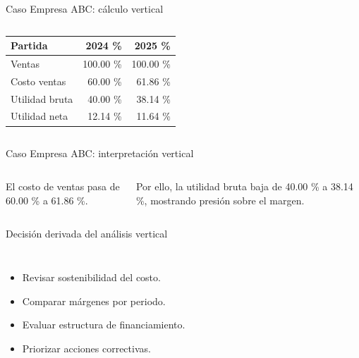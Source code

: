 \begin{frame}{Caso Empresa ABC: cálculo vertical}
  \begin{columns}[T,onlytextwidth]
    \scriptsize
    \begin{tabular}{lrr}
      \toprule
      Partida & 2024 \% & 2025 \% \\
      \midrule
      Ventas & 100.00 \% & 100.00 \% \\
      Costo ventas & 60.00 \% & 61.86 \% \\
      Utilidad bruta & 40.00 \% & 38.14 \% \\
      Utilidad neta & 12.14 \% & 11.64 \% \\
      \bottomrule
    \end{tabular}
  \end{columns}
\end{frame}

\begin{frame}{Caso Empresa ABC: interpretación vertical}
  \begin{columns}[T,onlytextwidth]
    \footnotesize
    El costo de ventas pasa de 60.00 \% a 61.86 \%.

    \vspace{0.5em}
    Por ello, la utilidad bruta baja de 40.00 \% a 38.14 \%, mostrando presión sobre el margen.
  \end{columns}
\end{frame}

\begin{frame}{Decisión derivada del análisis vertical}
  \begin{columns}[T,onlytextwidth]
    \begin{itemize}
      \item Revisar sostenibilidad del costo.
      \item Comparar márgenes por periodo.
      \item Evaluar estructura de financiamiento.
      \item Priorizar acciones correctivas.
    \end{itemize}
  \end{columns}
\end{frame}

